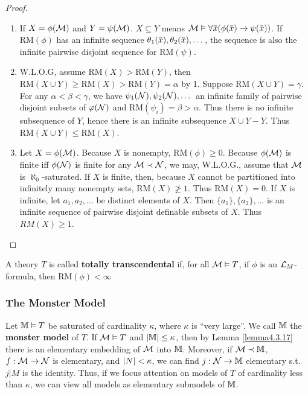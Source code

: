 \documentclass[11pt]{article}
\def \RM {\text{RM}}
\begin{document}
\begin{proof}
\begin{enumerate}
\item If \(X=\phi(\mathcal{M})\) and \(Y=\psi(\mathcal{M})\). \(X\subseteq Y\) means \(\calm\vDash\forall \barx(\phi(\barx)\to\psi(\barx))\). If \(\RM(\phi)\) has an
 infinite sequence \(\theta_1(\barx),\theta_2(\barx),\dots\), the sequence is also the infinite pairwise
disjoint sequence for \(\RM(\psi)\).
\item W.L.O.G, assume \(\RM(X)>\RM(Y)\), then \(\RM(X\cup Y)\ge\RM(X)>\RM(Y)=\alpha\) by 1.
Suppose \(\RM(X\cup Y)=\gamma\). For any \(\alpha<\beta<\gamma\), we have \(\psi_1(\mathcal{N}),\psi_2(\mathcal{N}),\dots\) an infinite family of
pairwise disjoint subsets of \(\varphi(\mathcal{N})\) and \(\RM(\psi_i)=\beta>\alpha\). Thus there is no infinite
subsequence of \(Y\), hence there is an infinite subsequence \(X\cup Y-Y\). Thus \(\RM(X\cup Y)\le \RM(X)\).
\item Let \(X=\phi(\mathcal{M})\). Because \(X\) is nonempty, \(\RM(\phi)\ge 0\). Because \(\phi(\mathcal{M})\) is finite
iff \(\phi(\mathcal{N})\) is finite for any \(\mathcal{M}\prec\mathcal{N}\), we may, W.L.O.G., assume that \(\mathcal{M}\)
is \(\aleph_0\)-saturated. If \(X\) is finite, then, because \(X\) cannot be partitioned into
infinitely many nonempty sets, \(\RM(X)\not\ge 1\). Thus \(\RM(X)=0\). If \(X\) is infinite,
let \(a_1,a_2,\dots\) be distinct elements of \(X\). Then
\(\{a_1\},\{a_2\},\dots\) is an infinite sequence of pairwise disjoint definable subsets of \(X\).
Thus \(RM(X)\ge 1\).
\end{enumerate}
\end{proof}

\begin{definition}[]
A theory \(T\) is called \textbf{totally transcendental} if, for all \(\mathcal{M}\vDash T\), if \(\phi\) is
an \(\mathcal{L}_M\)-formula, then \(\RM(\phi)<\infty\)
\end{definition}
\subsubsection{The Monster Model}
\label{sec:org8112ed8}
Let \(\mathbb{M}\vDash T\) be saturated of cardinality \(\kappa\), where \(\kappa\) is ``very large''. We call \(\mathbb{M}\) the \textbf{monster
model} of \(T\). If \(\mathcal{M}\vDash T\) and \(\abs{\M}\le\kappa\), then by Lemma \ref{lemma4.3.17} there is an
elementary embedding of \(\mathcal{M}\) into \(\mathbb{M}\). Moreover, if \(\mathcal{M}\prec\mathbb{M}\), \(f:\mathcal{M}\to\mathcal{N}\) is elementary,
and \(\abs{N}<\kappa\), we can find \(j:\mathcal{N}\to\mathbb{M}\) elementary s.t. \(j|M\) is the identity. Thus, if we
focus attention on models of \(T\) of cardinality less than \(\kappa\), we can view all models as
elementary submodels of \(\mathbb{M}\).
\end{document}
